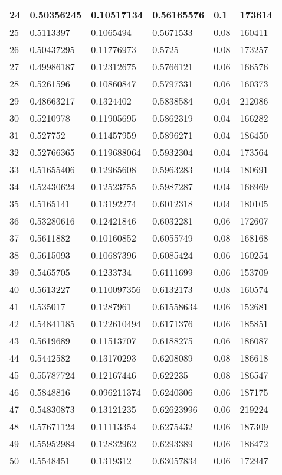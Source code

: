 \begin{longtable}{|l|l|l|l|l|l|}
24 & 0.50356245 & 0.10517134 & 0.56165576 & 0.1 & 173614 \\ \hline 
25 & 0.5113397 & 0.1065494 & 0.5671533 & 0.08 & 160411 \\ \hline 
26 & 0.50437295 & 0.11776973 & 0.5725 & 0.08 & 173257 \\ \hline 
27 & 0.49986187 & 0.12312675 & 0.5766121 & 0.06 & 166576 \\ \hline 
28 & 0.5261596 & 0.10860847 & 0.5797331 & 0.06 & 160373 \\ \hline 
29 & 0.48663217 & 0.1324402 & 0.5838584 & 0.04 & 212086 \\ \hline 
30 & 0.5210978 & 0.11905695 & 0.5862319 & 0.04 & 166282 \\ \hline 
31 & 0.527752 & 0.11457959 & 0.5896271 & 0.04 & 186450 \\ \hline 
32 & 0.52766365 & 0.119688064 & 0.5932304 & 0.04 & 173564 \\ \hline 
33 & 0.51655406 & 0.12965608 & 0.5963283 & 0.04 & 180691 \\ \hline 
34 & 0.52430624 & 0.12523755 & 0.5987287 & 0.04 & 166969 \\ \hline 
35 & 0.5165141 & 0.13192274 & 0.6012318 & 0.04 & 180105 \\ \hline 
36 & 0.53280616 & 0.12421846 & 0.6032281 & 0.06 & 172607 \\ \hline 
37 & 0.5611882 & 0.10160852 & 0.6055749 & 0.08 & 168168 \\ \hline 
38 & 0.5615093 & 0.10687396 & 0.6085424 & 0.06 & 160254 \\ \hline 
39 & 0.5465705 & 0.1233734 & 0.6111699 & 0.06 & 153709 \\ \hline 
40 & 0.5613227 & 0.110097356 & 0.6132173 & 0.08 & 160574 \\ \hline 
41 & 0.535017 & 0.1287961 & 0.61558634 & 0.06 & 152681 \\ \hline 
42 & 0.54841185 & 0.122610494 & 0.6171376 & 0.06 & 185851 \\ \hline 
43 & 0.5619689 & 0.11513707 & 0.6188275 & 0.06 & 186087 \\ \hline 
44 & 0.5442582 & 0.13170293 & 0.6208089 & 0.08 & 186618 \\ \hline 
45 & 0.55787724 & 0.12167446 & 0.622235 & 0.08 & 186547 \\ \hline 
46 & 0.5848816 & 0.096211374 & 0.6240306 & 0.06 & 187175 \\ \hline 
47 & 0.54830873 & 0.13121235 & 0.62623996 & 0.06 & 219224 \\ \hline 
48 & 0.57671124 & 0.11113354 & 0.6275432 & 0.06 & 187309 \\ \hline 
49 & 0.55952984 & 0.12832962 & 0.6293389 & 0.06 & 186472 \\ \hline 
50 & 0.5548451 & 0.1319312 & 0.63057834 & 0.06 & 172947 \\ \hline 
\end{longtable}
